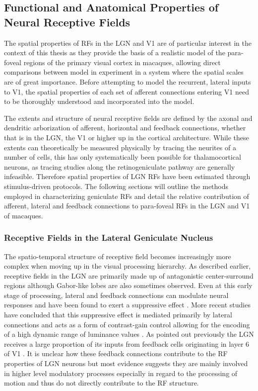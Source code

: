 \subsection{Functional and Anatomical Properties of Neural Receptive Fields}

The spatial properties of RFs in the LGN and V1 are of particular
interest in the context of this thesis as they provide the basis of a
realistic model of the para-foveal regions of the primary visual
cortex in macaques, allowing direct comparisons between model in
experiment in a system where the spatial scales are of great
importance. Before attempting to model the recurrent, lateral inputs
to V1, the spatial properties of each set of afferent connections
entering V1 need to be thoroughly understood and incorporated into the
model.

The extents and structure of neural receptive fields are defined by
the axonal and dendritic arborization of afferent, horizontal and
feedback connections, whether that is in the LGN, the V1 or higher up
in the cortical architecture. While these extents can theoretically be
measured physically by tracing the neurites of a number of cells, this
has only systematically been possible for thalamocortical
neurons, as tracing studies along the retinogeniculate
pathway are generally infeasible. Therefore spatial properties of LGN
RFs have been estimated through stimulus-driven protocols. The
following sections will outline the methods employed in characterizing
geniculate RFs and detail the relative contribution of afferent,
lateral and feedback connections to para-foveal RFs in the LGN and V1
of macaques.

\subsubsection{Receptive Fields in the Lateral Geniculate Nucleus}
\label{sec:LGNRF}

The spatio-temporal structure of receptive field becomes increasingly
more complex when moving up in the visual processing hierarchy. As
described earlier, receptive fields in the LGN are primarily made up
of antagonistic center-surround regions although Gabor-like lobes are
also sometimes observed. Even at this early stage of processing,
lateral and feedback connections can modulate neural responses and
have been found to exert a suppressive effect \citep{Hubel1961}. More
recent studies have concluded that this suppressive effect is mediated
primarily by lateral connections and acts as a form of contrast-gain
control allowing for the encoding of a high dynamic range of luminance
values \citep{Bonin2005}. As pointed out previously the LGN receives a
large proportion of its inputs from feedback cells originating in
layer 6 of V1 \citep{Sherman2002}. It is unclear how these feedback
connections contribute to the RF properties of LGN neurons but most
evidence suggests they are mainly involved in higher level modulatory
processes especially in regard to the processing of motion
\citep{Sillito2006} and thus do not directly contribute to the RF
structure.

